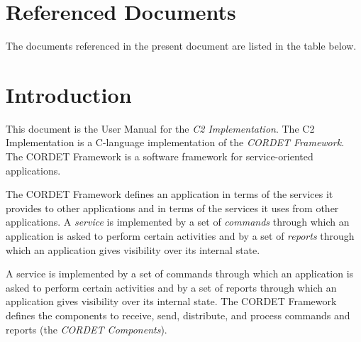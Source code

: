 \documentclass{pnp_article}
\begin{document}
\maketitle

\newcommand{\chgC}[1]{{\color{red}{#1}}{}} 		%


\tableofcontents
\listoffigures
\listoftables

\section{Referenced Documents}

The documents referenced in the present document are listed in the table below.

\listofreferencedocs{\CrUm}


\newpage
\section{Introduction}
This document is the User Manual for the \textit{C2 Implementation}. 
The C2 Implementation is a C-language implementation of the \textit{CORDET Framework}.
The CORDET Framework is a software framework for service-oriented applications. 

The CORDET Framework defines an application in terms of the services it provides to other applications and in terms of the services it uses from other applications.
A \textit{service} is implemented by a set of \textit{commands} through which an application is asked to perform certain activities and by a set of \textit{reports} through which an application gives visibility over its internal state.

A service is implemented by a set of commands through which an application is asked to perform certain activities and by a set of reports through which an application gives visibility over its internal state. The CORDET Framework defines the components to receive, send, distribute, and process commands and reports (the \textit{CORDET Components}).
\end{document}
